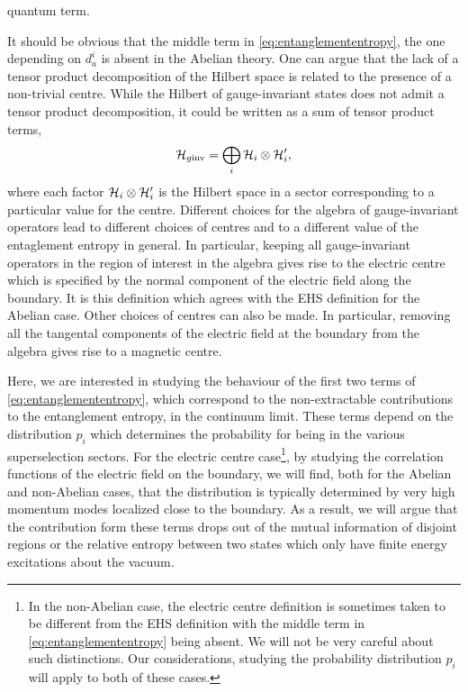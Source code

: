 quantum term.
\par It should be obvious that the middle term in
\eqref{eq:entanglemententropy}, the one depending on $d_a^i$ is absent in the
Abelian theory. One can argue that the lack of a tensor product decomposition
of the Hilbert space is related to the presence of a non-trivial centre. While
the Hilbert of gauge-invariant states does not admit a  tensor product
decomposition, it could be written as a sum of tensor product terms,
\begin{equation}
  \mathcal{H}_{g\mathrm{inv}} = \bigoplus_i\mathcal{H}_i\otimes\mathcal{H}_i',
\end{equation}
where each factor $\mathcal{H}_i\otimes\mathcal{H}_i'$ is the Hilbert space in 
a sector corresponding to a particular value for the centre. Different choices
for the algebra of gauge-invariant operators lead to different choices of
centres and to a different value of the entaglement entropy in general. In
particular, keeping all gauge-invariant operators in the region of interest in
the algebra gives rise to the electric centre which is specified by the normal
component of the electric field along the boundary. It is this definition
which agrees with the EHS definition for the Abelian case. Other choices of
centres can also be made. In particular, removing all the tangental components
of the electric field at the boundary from the algebra gives rise to a magnetic
centre.
\par Here, we are interested in studying the behaviour of the first two terms 
of \eqref{eq:entanglemententropy}, which correspond to the non-extractable
contributions to the entanglement entropy, in the continuum limit. These terms
depend on the distribution $p_i$ which determines the probability for being in
the various superselection sectors. For the electric centre case\footnote{In
  the non-Abelian case, the electric centre definition is sometimes taken to be
  different from the EHS definition with the middle term in
  \eqref{eq:entanglemententropy} being absent. We will not be very careful
  about such distinctions. Our considerations, studying the probability
distribution $p_i$ will apply to both of these cases.}, by studying the
correlation functions of the electric field on the boundary, we will find, both
for the Abelian and non-Abelian cases, that the distribution is typically 
determined by very high momentum modes localized close to the boundary. As
a result, we will argue that the contribution form these terms drops out of the
mutual information of disjoint regions or the relative entropy between two
states which only have finite energy excitations about the vacuum.
